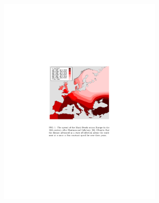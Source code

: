 \documentclass[aspectratio=169]{beamer}
\begin{document}
\begin{frame}

\begin{center}
\includegraphics[width = 0.6\textwidth]{figures/marvel_small-world_2013_fig1}
\end{center}


\end{frame}
\end{document}
